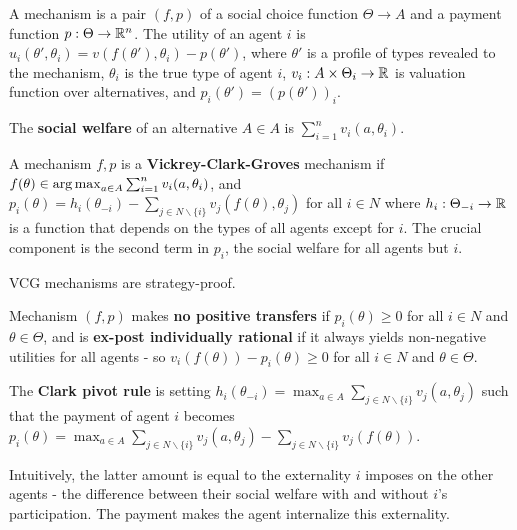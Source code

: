 \begin{defn}
  \label{sec:mech-with-paym-1}
  A mechanism is a pair $(f, p)$ of a social choice function $\Theta
  \rightarrow A$ and a payment function $p: \Theta \rightarrow
  \mathbb{R}^{n}$.  The utility of an agent $i$ is $u_{i}(\theta', \theta_{i})
  = v(f(\theta'), \theta_{i}) - p(\theta')$, where $\theta'$ is a
  profile of types revealed to the mechanism, $\theta_{i}$ is the true
  type of agent $i$, $v_{i}: A \times \Theta_{i} \rightarrow \mathbb{R}$ is
  valuation function over alternatives, and $p_{i}(\theta') =
  (p(\theta'))_{i}$.

  The \textbf{social welfare} of an alternative $A \in A$ is
  $\sum_{i=1}^{n} v_{i}(a, \theta_{i})$.
\end{defn}

\begin{defn}
  \label{sec:mech-with-paym-2}
  A mechanism $f, p$ is a \textbf{Vickrey-Clark-Groves} mechanism if
  $f(\theta) \in \operatorname*{arg\,max}_{a \in A} \sum_{i=1}^{n} v_{i}(a,
  \theta_{i})$, and $p_{i}(\theta) = h_{i}(\theta_{-i}) - \sum_{j \in
    N \backslash \{ i \} }^{} v_{j}(f(\theta), \theta_{j})$ for all $i
  \in N$ where $h_{i}: \Theta_{-i} \rightarrow \mathbb{R}$ is a function that
  depends on the types of all agents except for $i$.  The crucial
  component is the second term in $p_{i}$, the social welfare for all
  agents but $i$.
  
\end{defn}

\begin{thm}
  \label{sec:mech-with-paym-3}
  VCG mechanisms are strategy-proof.
\end{thm}

\begin{defn}
  \label{sec:mech-with-paym-4}
  Mechanism $(f, p)$ makes \textbf{no positive transfers} if
  $p_{i}(\theta) \geq 0$ for all $i \in N$ and $\theta \in \Theta$,
  and is \textbf{ex-post individually rational} if it always yields
  non-negative utilities for all agents - so $v_{i}(f(\theta)) -
  p_{i}(\theta) \geq 0$ for all $i \in N$ and $\theta \in \Theta$.

  The \textbf{Clark pivot rule} is setting $h_{i}(\theta_{-i}) =
  \max_{a \in A} \sum_{j \in N \backslash \{ i \} }^{} v_{j}(a,
  \theta_{j})$ such that the payment of agent $i$ becomes
  $p_{i}(\theta) = \max_{a \in A} \sum_{j \in N \backslash \{ i \}
  }^{} v_{j}(a, \theta_{j}) - \sum_{j \in N \backslash \{ i \}}
  v_{j}(f(\theta))$.

  Intuitively, the latter amount is equal to the externality $i$
  imposes on the other agents - the difference between their social
  welfare with and without $i$'s participation.  The payment makes the
  agent internalize this externality.
\end{defn}

